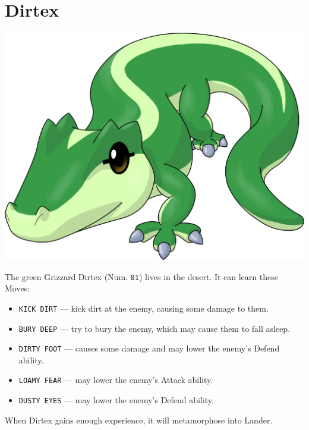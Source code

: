 \documentclass[9pt,twocolumn,openany,article]{memoir}
\newenvironment{ritemize}{\begin{itemize}\raggedright}{\end{itemize}}
\newcommand\englishskip{\vspace{14pt}}
\begin{document}


\ifdefined\DEMO\else


\section{Dirtex}

\begin{center}
  \englishskip
  \includegraphics[width=.8\columnwidth]{../Manual/Dirtex.png}
  \englishskip
\end{center}

\noindent{}The  green Grizzard  Dirtex (Num.  \texttt{01}) lives  in the
desert. It can learn these Moves:

\begin{ritemize}
\item \texttt{KICK DIRT} --- kick dirt at the enemy, causing some damage
  to them.
\item \texttt{BURY DEEP} --- try to bury the enemy, which may cause them
  to fall asleep.
\item  \texttt{DIRTY FOOT}  --- causes  some  damage and  may lower  the
  enemy's Defend ability.
\item \texttt{LOAMY FEAR} --- may lower the enemy's Attack ability.
\item \texttt{DUSTY EYES} --- may lower the enemy's Defend ability.
\end{ritemize}

When Dirtex gains enough experience, it will metamorphose into Lander.
\end{document}
